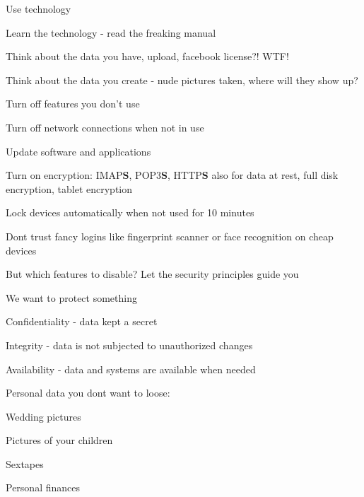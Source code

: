 \documentclass[Screen16to9,17pt]{foils}
\begin{document}

\begin{list1}
\item Use technology
\item Learn the technology - read the freaking manual
\item Think about the data you have, upload, facebook license?! WTF!
\item Think about the data you create - nude pictures taken, where will they show up?
\begin{list2}
\item Turn off features you don't use
\item Turn off network connections when not in use
\item Update software and applications
\item Turn on encryption: IMAP{\bf S}, POP3{\bf S},
  HTTP{\bf S} also for data at rest, full disk encryption, tablet encryption
\item Lock devices automatically when not used for 10 minutes
\item Dont trust fancy logins like fingerprint scanner or face recognition on cheap devices
\end{list2}
\end{list1}

But which features to disable? Let the security principles guide you



\begin{list1}
\item We want to protect something
\item Confidentiality - data kept a secret
\item Integrity - data is not subjected to unauthorized changes
\item Availability - data and systems are available when needed
\end{list1}


\begin{list1}
\item Personal data you dont want to loose:
\begin{list2}
\item Wedding pictures
\item Pictures of your children
\item Sextapes
\item Personal finances
\end{list2}
\end{list1}
\end{document}
